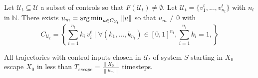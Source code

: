 \begin{property}
Let $\mathcal{U}_t \subseteq \mathcal{U}$ a subset of controls so that $F(\mathcal{U}_t) \neq \emptyset$. Let $\mathcal{U}_t = \{v_1^t,...,v_{n_t}^t\}$ with $n_t$ in $\mathbb{N}$.
There exists 
$ u_m = \operatorname*{arg\,min}_{u \in C_{\mathcal{U}_t}} \left \| u \right \|$ so that $u_m \neq 0$ with
\begin{equation}
C_{\mathcal{U}_t}=
\left \{
\sum_{i=1}^{n_t} k_i \, v^t_i
\mid 
\forall (k_1,...,k_{n_t}) \in [0,1]^{n_t},
\sum_{i=1}^{n_t} k_i = 1,
\right \}
\end{equation}



All trajectories with control inputs chosen in $\mathcal{U}_t$  of system $S$ starting in $X_0$ escape $X_0$ in less than $T_{escape} =\frac{\left \| X_0 \right \|}{\left \| u_m \right \|}$ timesteps.
\end{property}

